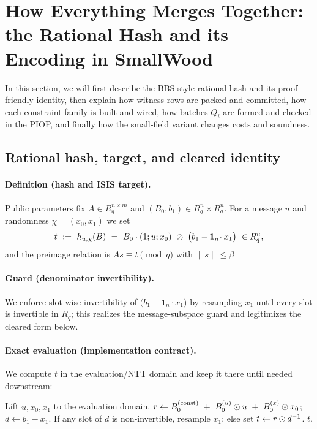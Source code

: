 \section{How Everything Merges Together: the Rational Hash and its Encoding in SmallWood}
\label{sec:Everything-Merges}

In this section, we will first describe the BBS‑style rational hash and its proof-friendly identity, then explain how witness rows are packed and committed, how each constraint family is built and wired, how batches $Q_i$ are formed and checked in the PIOP, and finally how the small‑field variant changes costs and soundness.

\subsection{Rational hash, target, and cleared identity}
\label{subsec:merge-rational}

\paragraph{Definition (hash and ISIS target).}
Public parameters fix $A\in R_q^{n\times m}$ and $(B_0,b_1)\in R_q^{n}\times R_q^{n}$. For a message $u$ and randomness $\chi=(x_0,x_1)$ we set
\[
  t \ :=\ h_{u,\chi}(B)\ =\ B_0\cdot(1;u;x_0)\ \Hdiv\ \bigl(b_1-\mathbf 1_n\!\cdot x_1\bigr)\ \in R_q^{n},
\]
and the preimage relation is $A s \equiv t \pmod q$ with $\|s\| \le \beta$

\paragraph{Guard (denominator invertibility).}
We enforce slot‑wise invertibility of $\bigl(b_1-\mathbf 1_n\!\cdot x_1\bigr)$ by resampling $x_1$ until every slot is invertible in $R_q$; this realizes the message‑subspace guard and legitimizes the cleared form below.

\paragraph{Exact evaluation (implementation contract).}
We compute $t$ in the evaluation/NTT domain and keep it there until needed downstream:
\begin{algorithm}[H]
\caption{\textsf{ComputeBBSHash}$(B_0,b_1;u,x_0,x_1)\rightarrow t$ (evaluation/NTT domain)}
\label{alg:compute-bbs-exact}
\begin{algorithmic}[1]
\State Lift $u,x_0,x_1$ to the evaluation domain.
\State $r \gets B_0^{(\mathrm{const})}\ +\ B_0^{(u)}\odot u\ +\ B_0^{(x)}\odot x_0$;\quad $d \gets b_1 - x_1$.
\State If any slot of $d$ is non‑invertible, resample $x_1$; else set $t \gets r \odot d^{-1}$.
\State \Return $t$.
\end{algorithmic}
\end{algorithm}

